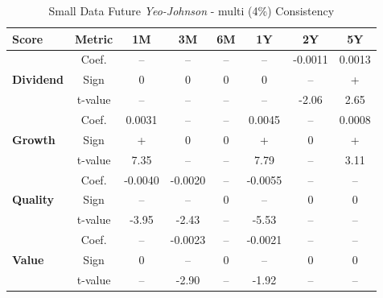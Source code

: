\documentclass[11pt,english,a4paper,hidelinks]{book}
\begin{document}
\begin{table}[H]
    \centering
    \begin{tabular}{lccccccc}
        \toprule
        \textbf{Score} & \textbf{Metric} & \textbf{1M} & \textbf{3M} & \textbf{6M} & \textbf{1Y} & \textbf{2Y} & \textbf{5Y} \\
        \midrule
        \multirow{3}{*}{\textbf{Dividend}} 
            & Coef.   & --      & --      & --      & --      & -0.0011 & 0.0013 \\
            & Sign    & 0       & 0       & 0       & 0       & --      & +      \\
            & t-value & --      & --      & --      & --      & -2.06   & 2.65   \\
        \midrule
        \multirow{3}{*}{\textbf{Growth}} 
            & Coef.   & 0.0031  & --      & --      & 0.0045  & --      & 0.0008 \\
            & Sign    & +       & 0       & 0       & +       & 0       & +      \\
            & t-value & 7.35    & --      & --      & 7.79    & --      & 3.11   \\
        \midrule
        \multirow{3}{*}{\textbf{Quality}} 
            & Coef.   & -0.0040 & -0.0020 & --      & -0.0055 & --      & --     \\
            & Sign    & --      & --      & 0       & --      & 0       & 0      \\
            & t-value & -3.95   & -2.43   & --      & -5.53   & --      & --     \\
        \midrule
        \multirow{3}{*}{\textbf{Value}} 
            & Coef.   & --      & -0.0023 & --      & -0.0021 & --      & --     \\
            & Sign    & 0       & --      & 0       & --      & 0       & 0      \\
            & t-value & --      & -2.90   & --      & -1.92   & --      & --     \\
        \bottomrule
    \end{tabular}
    \caption{Small Data Future \textit{Yeo-Johnson} - \acrshort{multi} (4\%) Consistency}
    \label{tab:first_linear_regression_results_scores_gaussian}
\end{table}
\end{document}
